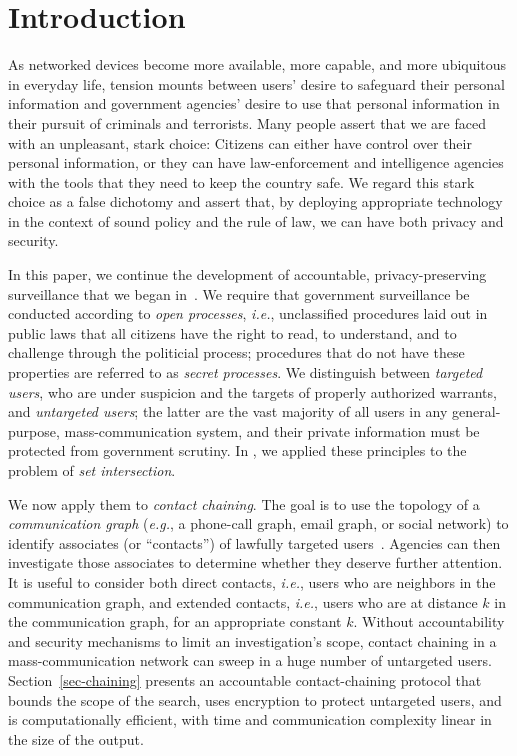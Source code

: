 \section{Introduction}\label{sec-introduction}
As networked devices become more available, more capable, and more ubiquitous
in everyday life, tension mounts between users' desire to safeguard their 
personal information and government agencies' desire to use that personal 
information in their pursuit of criminals and terrorists.  Many people assert
that we are faced with an unpleasant, stark choice: Citizens can either have
control over their personal information, or they can have
law-enforcement and intelligence agencies with the tools that they need to
keep the country safe. We regard this stark choice as a false dichotomy and 
assert that, by deploying appropriate technology in the context of 
sound policy and the rule of law, we can have both privacy and security.

In this paper, we continue the development of accountable, privacy-preserving 
surveillance that we began in~\cite{sff-foci2014}. We require that government 
surveillance be conducted according to {\it open processes}, {\it i.e.}, 
unclassified procedures laid out in public laws that all citizens have the
right to read, to understand, and to challenge through the politicial process;
procedures that do not have these properties are referred to as {\it secret
processes}.  We distinguish between {\it targeted users}, who are 
under suspicion and the targets of properly authorized warrants, and
{\it untargeted users}; the latter are the vast majority of all 
users in any general-purpose, mass-communication system, and their private
information must be protected from government scrutiny. In \cite{sff-foci2014},
we applied these principles to the problem of {\it set intersection}. 

We now apply them to {\it contact chaining}.
The goal is to use the topology of a {\it communication 
graph} ({\it e.g.}, a phone-call graph, email graph, or social network) 
to identify associates (or ``contacts'') of 
lawfully targeted users~\cite{techdirt}. 
Agencies can then investigate those associates to determine whether
they deserve further attention.
It is useful to consider both direct contacts, 
{\it i.e.}, users who are neighbors in the communication graph, and
extended contacts, {\it i.e.}, users who are at distance $k$ in the 
communication graph, for an appropriate constant $k$.
Without accountability and security mechanisms to
limit an investigation's scope, contact chaining in a mass-communication
network can sweep in a huge number of untargeted users.
Section~\ref{sec-chaining} presents an accountable contact-chaining
protocol that bounds the scope of the search, uses encryption to protect 
untargeted users, and is computationally efficient,
with time and communication complexity linear in the size of the output.

